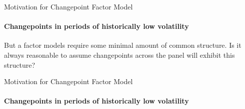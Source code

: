 \documentclass{beamer}
\begin{document}
\begin{frame}{Motivation for Changepoint Factor Model}
\framesubtitle{Changepoints in periods of historically low volatility}

But a factor models require some minimal amount of common structure. Is it always reasonable to assume changepoints across the panel will exhibit this structure? 

\begin{figure}
    \centering
    \begin{subfigure}
        \texttt{[image: ../plots/SnP500\_LR\_COVID.png]}
    \end{subfigure}
    \begin{subfigure}
        \texttt{[image: ../plots/SnP500\_LR\_lowvol.png]}
    \end{subfigure}
\end{figure}

\end{frame}




\begin{frame}{Motivation for Changepoint Factor Model}
\framesubtitle{Changepoints in periods of historically low volatility}

\begin{figure}[h]
	\centering
\end{figure}

\end{frame}



\end{document}

